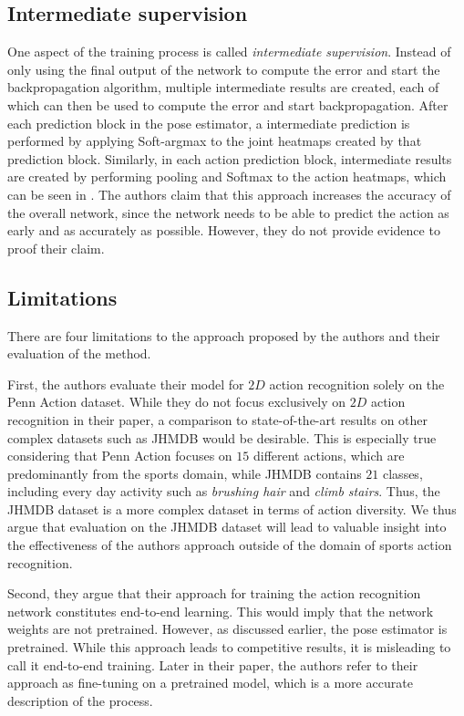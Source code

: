 \subsection{Intermediate supervision}
\label{sec:luvizon_intermediate_supervision}
One aspect of the training process is called \textit{intermediate supervision}.
Instead of only using the final output of the network to compute the error and start the backpropagation algorithm, multiple intermediate results are created, each of which can then be used to compute the error and start backpropagation.
After each prediction block in the pose estimator, a intermediate prediction is performed by applying Soft-argmax to the joint heatmaps created by that prediction block.
Similarly, in each action prediction block, intermediate results are created by performing pooling and Softmax to the action heatmaps, which can be seen in .
The authors claim that this approach increases the accuracy of the overall network, since the network needs to be able to predict the action as early and as accurately as possible.
However, they do not provide evidence to proof their claim.

\subsection{Limitations}
\label{sec:deephar_limitations}
There are four limitations to the approach proposed by the authors and their evaluation of the method.

First, the authors evaluate their model for $2D$ action recognition solely on the Penn Action dataset.
While they do not focus exclusively on $2D$ action recognition in their paper, a comparison to state-of-the-art results on other complex datasets such as JHMDB would be desirable.
This is especially true considering that Penn Action focuses on $15$ different actions, which are predominantly from the sports domain, while JHMDB contains $21$ classes, including every day activity such as \textit{brushing hair} and \textit{climb stairs}.
Thus, the JHMDB dataset is a more complex dataset in terms of action diversity.
We thus argue that evaluation on the JHMDB dataset will lead to valuable insight into the effectiveness of the authors approach outside of the domain of sports action recognition.

Second, they argue that their approach for training the action recognition network constitutes end-to-end learning.
This would imply that the network weights are not pretrained.
However, as discussed earlier, the pose estimator is pretrained.
While this approach leads to competitive results, it is misleading to call it end-to-end training.
Later in their paper, the authors refer to their approach as fine-tuning on a pretrained model, which is a more accurate description of the process.

